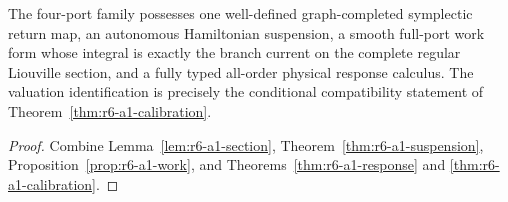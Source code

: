 \begin{theorem}
\label{thm:r6-a1-main}
The four-port family possesses one well-defined graph-completed symplectic
return map, an autonomous Hamiltonian suspension, a smooth full-port work form
whose integral is exactly the branch current on the complete regular
Liouville section, and a fully typed all-order physical response calculus.
The valuation identification is precisely the conditional compatibility
statement of Theorem~\ref{thm:r6-a1-calibration}.
\end{theorem}

\begin{proof}
Combine Lemma~\ref{lem:r6-a1-section},
Theorem~\ref{thm:r6-a1-suspension},
Proposition~\ref{prop:r6-a1-work}, and
Theorems~\ref{thm:r6-a1-response} and
\ref{thm:r6-a1-calibration}.
\end{proof}
